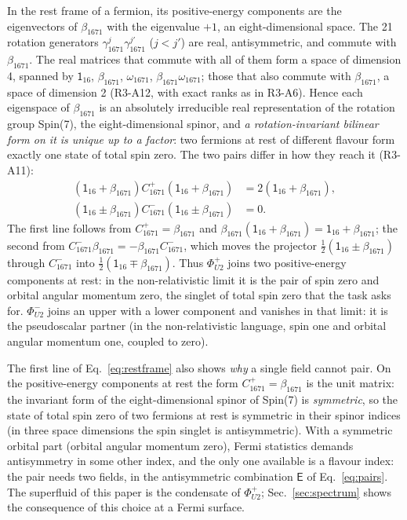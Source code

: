 In the rest frame of a fermion, its positive-energy components are the eigenvectors of
$\beta_{1671}$ with the eigenvalue $+1$, an eight-dimensional space. The 21 rotation generators
$\gamma^j_{1671}\gamma^{j'}_{1671}$ ($j<j'$) are real, antisymmetric, and commute with
$\beta_{1671}$. The real matrices that commute with all of them form a space of dimension 4,
spanned by $\mathsf 1_{16}$, $\beta_{1671}$, $\omega_{1671}$, $\beta_{1671}\omega_{1671}$; those that
also commute with $\beta_{1671}$, a space of dimension 2 (R3-A12, with exact ranks as in R3-A6).
Hence each eigenspace of $\beta_{1671}$ is an absolutely irreducible real representation of the
rotation group Spin(7), the eight-dimensional spinor, and \emph{a rotation-invariant bilinear
form on it is unique up to a factor}: two fermions at rest of different flavour form exactly one
state of total spin zero. The two pairs differ in how they reach it (R3-A11):
\begin{equation}
\begin{aligned}
(\mathsf 1_{16}+\beta_{1671})C^+_{1671}(\mathsf 1_{16}+\beta_{1671})&=2(\mathsf 1_{16}+\beta_{1671}),\\
(\mathsf 1_{16}\pm\beta_{1671})C^-_{1671}(\mathsf 1_{16}\pm\beta_{1671})&=0.
\end{aligned}
\label{eq:restframe}
\end{equation}
The first line follows from $C^+_{1671}=\beta_{1671}$ and
$\beta_{1671}(\mathsf 1_{16}+\beta_{1671})=\mathsf 1_{16}+\beta_{1671}$; the second from
$C^-_{1671}\beta_{1671}=-\beta_{1671}C^-_{1671}$, which moves the projector
$\tfrac12(\mathsf 1_{16}\pm\beta_{1671})$ through $C^-_{1671}$ into
$\tfrac12(\mathsf 1_{16}\mp\beta_{1671})$. Thus $\Phi^+_{U2}$ joins two positive-energy components at
rest: in the non-relativistic limit it is the pair of spin zero and orbital angular momentum zero,
the singlet of total spin zero that the task asks for. $\Phi^-_{U2}$ joins an upper with a lower
component and vanishes in that limit: it is the pseudoscalar partner (in the non-relativistic
language, spin one and orbital angular momentum one, coupled to zero).

The first line of Eq.~\eqref{eq:restframe} also shows \emph{why} a single field cannot pair. On
the positive-energy components at rest the form $C^+_{1671}=\beta_{1671}$ is the unit matrix: the
invariant form of the eight-dimensional spinor of Spin(7) is \emph{symmetric}, so the state of
total spin zero of two fermions at rest is symmetric in their spinor indices (in three space
dimensions the spin singlet is antisymmetric). With a symmetric orbital part (orbital angular
momentum zero), Fermi statistics demands antisymmetry in some other index, and the only one
available is a flavour index: the pair needs two fields, in the antisymmetric combination
$\mathsf E$ of Eq.~\eqref{eq:pairs}. The superfluid of this paper is the condensate of
$\Phi^+_{U2}$; Sec.~\ref{sec:spectrum} shows the consequence of this
choice at a Fermi surface.

